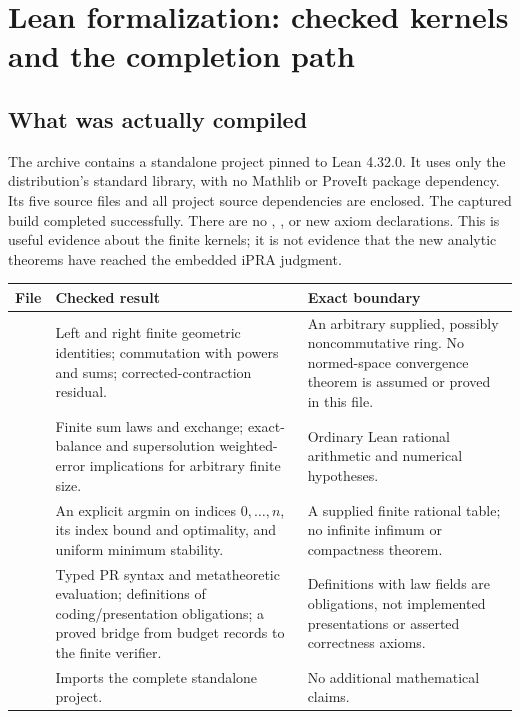 \section{Lean formalization: checked kernels and the completion path}\label{sec:formalization}

\subsection{What was actually compiled}

The archive contains a standalone project pinned to Lean 4.32.0. It uses only the distribution's standard library, with no Mathlib or ProveIt package dependency. Its five source files and all project source dependencies are enclosed. The captured build completed successfully. There are no , , or new axiom declarations. This is useful evidence about the finite kernels; it is not evidence that the new analytic theorems have reached the embedded iPRA judgment.

\begin{longtable}{@{}P{.26\textwidth}P{.39\textwidth}P{.28\textwidth}@{}}
\toprule File & Checked result & Exact boundary\\\midrule\endhead
{} & Left and right finite geometric identities; commutation with powers and sums; corrected-contraction residual. & An arbitrary supplied, possibly noncommutative ring. No normed-space convergence theorem is assumed or proved in this file.\\
 & Finite sum laws and exchange; exact-balance and supersolution weighted-error implications for arbitrary finite size. & Ordinary Lean rational arithmetic and numerical hypotheses.\\
 & An explicit argmin on indices $0,\ldots,n$, its index bound and optimality, and uniform minimum stability. & A supplied finite rational table; no infinite infimum or compactness theorem.\\
 & Typed PR syntax and metatheoretic evaluation; definitions of coding/presentation obligations; a proved bridge from budget records to the finite verifier. & Definitions with law fields are obligations, not implemented presentations or asserted correctness axioms.\\
 & Imports the complete standalone project. & No additional mathematical claims.\\
\bottomrule
\end{longtable}

